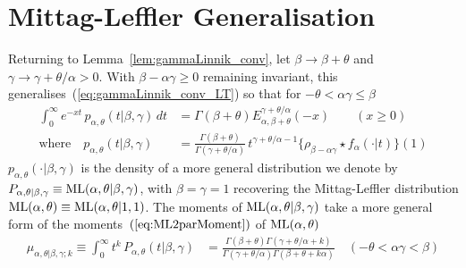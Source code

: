\documentclass[a4paper,12pt]{article}
\begin{document}
{{{\section{Mittag-Leffler Generalisation}
\label{sec:generalisation}
Returning to Lemma~\ref{lem:gammaLinnik_conv}, let $\beta\to\beta+\theta$ and $\gamma\to\gamma+\theta/\alpha>0$.
With $\beta-\alpha\gamma\ge0$ remaining invariant, this generalises~(\ref{eq:gammaLinnik_conv_LT}) 
so  that for   $-\theta<\alpha\gamma\le\beta$
\begin{align}
\int_0^\infty  e^{-xt} \, p_{\alpha,\theta}(t\vert \beta,\gamma) \, dt   
&= \Gamma(\beta+\theta)E^{\gamma+\theta/\alpha}_{\alpha,\beta+\theta}(-x) \qquad (x\ge0)
\\
\textrm{where} \quad
p_{\alpha,\theta}(t\vert \beta,\gamma) 
&= \frac{\Gamma(\beta+\theta)}{\Gamma(\gamma+\theta/\alpha)} \, t^{\gamma+\theta/\alpha-1}
 \{\rho_{\beta-\alpha\gamma}\star f_\alpha(\cdot\vert  t)\}(1) 
\label{eq:rho_Linnik_convdensitygen}
\end{align}
$p_{\alpha,\theta}(\cdot \vert \beta,\gamma)$ is the density of a more general distribution %
we denote by 
$P_{\alpha,\theta\vert\beta,\gamma}\equiv {\rm ML}(\alpha,\theta \vert \beta,\gamma)$,
with $\beta=\gamma=1$ recovering the Mittag-Leffler distribution 
${\rm ML}(\alpha,\theta)\equiv{\rm ML}(\alpha,\theta \vert 1,1)$.
The moments of ${\rm ML}(\alpha,\theta \vert \beta,\gamma)$ take  a  more general form of the moments~$(\ref{eq:ML2parMoment})$ of 
${\rm ML}(\alpha,\theta)$
\begin{align}
\mu_{\alpha,\theta\vert\beta,\gamma;k} \equiv \int_0^\infty t^k \, P_{\alpha,\theta}(t\vert \beta,\gamma) 
&= \frac{\Gamma(\beta+\theta)\Gamma(\gamma+\theta/\alpha+k)}{\Gamma(\gamma+\theta/\alpha)\Gamma(\beta+\theta+k\alpha)}  
\quad  (-\theta<\alpha\gamma<\beta) 
 \label{eq:rho_Linnik_convdensitygen_moments} 
 \end{align}

}}}
\end{document}
